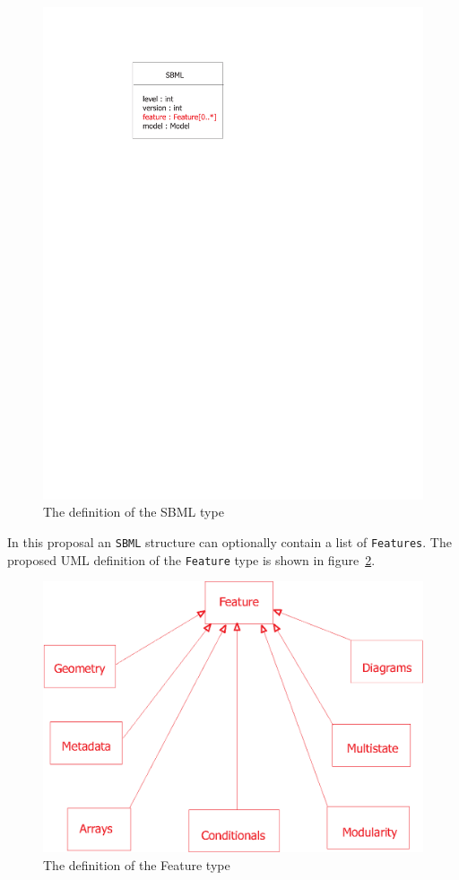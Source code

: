 \documentclass{cekarticle}
\begin{document}
\begin{figure}[h]
  \vspace*{8pt}
  \centering
  \includegraphics[scale = 0.7]{sbml}
  \caption{The definition of the SBML type}
  \label{fig:sbml}
\end{figure}

In this proposal an \texttt{SBML} structure can optionally
contain a list of \texttt{Features}.  The proposed UML definition of the
\texttt{Feature} type is shown in figure~\ref{fig:feature}.

\begin{figure}[h]
  \vspace*{8pt}
  \centering
  \includegraphics[scale = 0.7]{feature}
  \caption{The definition of the Feature type}
  \label{fig:feature}
\end{figure}
\end{document}
